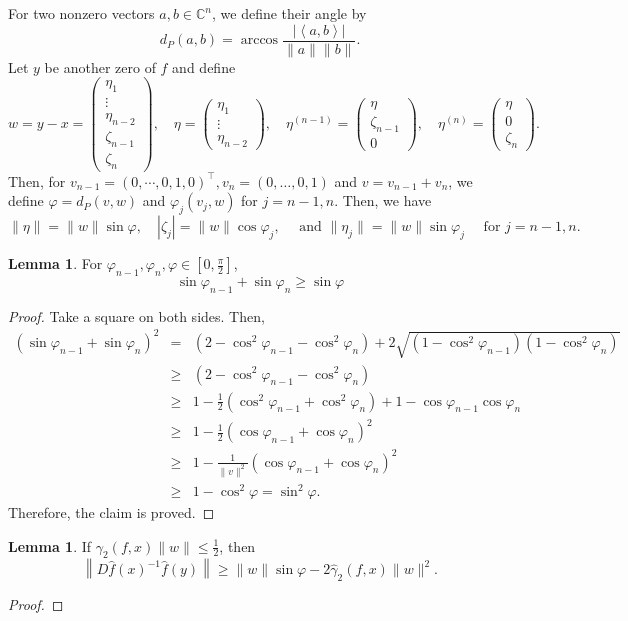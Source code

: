 \documentclass[12pt,oneside,reqno]{amsart}
\theoremstyle{definition}
\newtheorem{lem}[thm]{Lemma}
\begin{document}
For two nonzero vectors $a,b\in \mathbb{C}^n$, we define their angle by
\[d_P(a,b)=\arccos\frac{|\left<a,b\right>|}{\|a\|\|b\|}.\]
Let $y$ be another zero of $f$ and define
\[w=y-x=\left(\begin{array}{c}
\eta_1\\
\vdots\\
\eta_{n-2}\\
\zeta_{n-1}\\
\zeta_n
\end{array}\right),\quad \eta=\left(\begin{array}{c}
\eta_1\\
\vdots\\
\eta_{n-2}
\end{array}\right),\quad\eta^{(n-1)}=\left(\begin{array}{c}
\eta\\
\zeta_{n-1}\\
0
\end{array}\right),\quad \eta^{(n)}=\left(\begin{array}{c}
\eta\\
0\\
\zeta_{n}
\end{array}\right).\]
Then, for $v_{n-1}=(0,\cdots,0,1,0)^\top, v_n=(0,\dots,0,1)$ and $v=v_{n-1}+v_n$, we define $\varphi=d_P(v,w)$ and $\varphi_j(v_j,w)$ for $j=n-1,n$. Then, we have
\[\|\eta\|=\|w\|\sin\varphi,\quad |\zeta_j|=\|w\|\cos\varphi_j,\quad\text{ and }\|\eta_j\|=\|w\|\sin\varphi_j \quad\text{ for }j=n-1,n.\]
\begin{lem}\label{lem:sinIneq}
	For $\varphi_{n-1},\varphi_n,\varphi \in [0,\frac{\pi}{2}]$,
	\[\sin\varphi_{n-1}+\sin\varphi_n\geq \sin \varphi\]
\end{lem}
\begin{proof}
	Take a square on both sides. Then,
	\begin{eqnarray*}
		\left(\sin\varphi_{n-1}+\sin\varphi_n\right)^2& = & \left(2-\cos^2\varphi_{n-1}-\cos^2\varphi_n\right)+2\sqrt{\left(1-\cos^2\varphi_{n-1}\right)\left(1-\cos^2\varphi_n\right)}\\
		&\geq & \left(2-\cos^2\varphi_{n-1}-\cos^2\varphi_n\right)\\
		& \geq & 1-\frac{1}{2}\left(\cos^2\varphi_{n-1}+\cos^2\varphi_n\right)+1-\cos\varphi_{n-1}\cos\varphi_n\\
		& \geq & 1-\frac{1}{2}\left(\cos\varphi_{n-1}+\cos\varphi_n\right)^2\\
		& \geq & 1-\frac{1}{\|v\|^2}\left(\cos\varphi_{n-1}+\cos\varphi_n\right)^2\\
		&\geq & 1-\cos^2\varphi=\sin^2\varphi.
	\end{eqnarray*}
	Therefore, the claim is proved.
\end{proof}
\begin{lem}\cite[Lemma 1]{hao2017computing}\label{lem:bigAngleCase}
	If $\gamma_2(f,x)\|w\|\leq \frac{1}{2}$, then
	\[\left\|D\hat{f}(x)^{-1}\hat{f}(y)\right\|\geq \|w\|\sin\varphi -2\hat{\gamma}_2(f,x)\|w\|^2.\]
\end{lem}
\begin{proof}
\end{proof}
\end{document}
